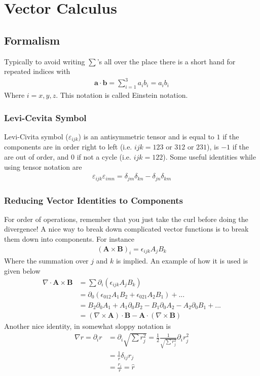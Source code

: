 \chapter{Vector Calculus}

\section{Formalism}
Typically to avoid writing $\sum$'s all over the place there is a short hand for repeated indices with
\begin{align}
\textbf{a}\cdot\textbf{b} = \sum_{i=1}^3 a_ib_i = a_ib_i
\end{align}
Where $i = x,y,z$. This notation is called Einstein notation.


\subsection{Levi-Cevita Symbol}
 Levi-Civita symbol ($\varepsilon_{ijk}$)  is an antisymmetric tensor and is equal to $1$ if the components are in order right to left (i.e. $ijk = 123$ or $312$ or $231$), is $-1$ if the are out of order, and 0 if not a cycle (i.e. $ijk = 122$). Some useful identities while using tensor notation are
 \begin{align}
 \varepsilon_{ijk}\varepsilon_{imn} = \delta_{jm}\delta_{kn} - \delta_{jn}\delta_{km}
 \end{align}


\subsection{Reducing Vector Identities to Components}
For order of operations, remember that you just take the curl before doing the divergence! A nice way to break down complicated vector functions is to break them down into components. For instance
\begin{align}
(\textbf{A} \times \textbf{B})_i = \epsilon_{ijk}A_jB_k
\end{align}
Where the summation over $j$ and $k$ is implied. An example of how it is used is given below
\begin{align}
\nabla\cdot\textbf{A}\times\textbf{B} &= \sum \partial_i(\epsilon_{ijk}A_jB_k) \\
&= \partial_0(\epsilon_{012}A_1B_2 + \epsilon_{021}A_2B_1) + ...\\
&= B_2\partial_0A_1 + A_1\partial_0B_2 - B_1\partial_0A_2 - A_2\partial_0B_1 + ...\\
&= (\nabla\times\textbf{A})\cdot\textbf{B} - \textbf{A}\cdot(\nabla\times\textbf{B})
\end{align}
Another nice identity, in somewhat sloppy notation is
\begin{align}
	\nabla r = \partial_i r &= \partial_i \sqrt{\sum r_j^2} = \frac{1}{2}\frac{1}{\sqrt{\sum r_j^2}}\partial_ir_j^2\\
	&= \frac{1}{r}\delta_{ij} r_j\\
	&= \frac{r_i}{r} = \hat{r}
\end{align}



